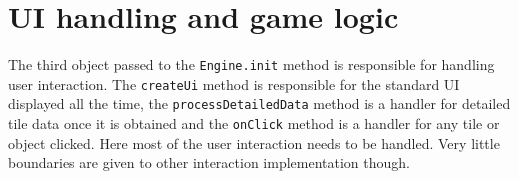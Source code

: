 \documentclass[11pt,oneside, final]{fithesis2}
\begin{document}
\section{UI handling and game logic}
The third object passed to the \texttt{Engine.init} method is responsible for handling user interaction. The \texttt{createUi} method is responsible for the standard UI displayed all the time, the \texttt{processDetailedData} method is a handler for detailed tile data once it is obtained and the \texttt{onClick} method is a handler for any tile or object clicked. Here most of the user interaction needs to be handled. Very little boundaries are given to other interaction implementation though.
\end{document}
